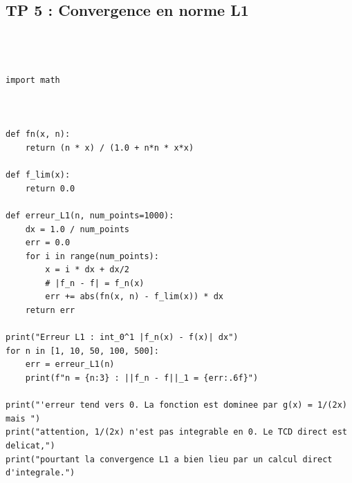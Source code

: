 \documentclass[11pt,a4paper]{article}
\begin{document}
\subsection*{TP 5 : Convergence en norme L1}

\begin{lstlisting}



import math



def fn(x, n):
    return (n * x) / (1.0 + n*n * x*x)

def f_lim(x):
    return 0.0

def erreur_L1(n, num_points=1000):
    dx = 1.0 / num_points
    err = 0.0
    for i in range(num_points):
        x = i * dx + dx/2
        # |f_n - f| = f_n(x)
        err += abs(fn(x, n) - f_lim(x)) * dx
    return err

print("Erreur L1 : int_0^1 |f_n(x) - f(x)| dx")
for n in [1, 10, 50, 100, 500]:
    err = erreur_L1(n)
    print(f"n = {n:3} : ||f_n - f||_1 = {err:.6f}")

print("'erreur tend vers 0. La fonction est dominee par g(x) = 1/(2x) mais ")
print("attention, 1/(2x) n'est pas integrable en 0. Le TCD direct est delicat,")
print("pourtant la convergence L1 a bien lieu par un calcul direct d'integrale.")
\end{lstlisting}
\end{document}
